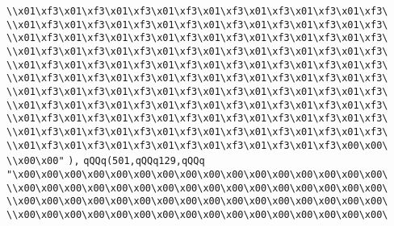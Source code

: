 \verb|\\x01\xf3\x01\xf3\x01\xf3\x01\xf3\x01\xf3\x01\xf3\x01\xf3\x01\xf3\|\newline
\verb|\\x01\xf3\x01\xf3\x01\xf3\x01\xf3\x01\xf3\x01\xf3\x01\xf3\x01\xf3\|\newline
\verb|\\x01\xf3\x01\xf3\x01\xf3\x01\xf3\x01\xf3\x01\xf3\x01\xf3\x01\xf3\|\newline
\verb|\\x01\xf3\x01\xf3\x01\xf3\x01\xf3\x01\xf3\x01\xf3\x01\xf3\x01\xf3\|\newline
\verb|\\x01\xf3\x01\xf3\x01\xf3\x01\xf3\x01\xf3\x01\xf3\x01\xf3\x01\xf3\|\newline
\verb|\\x01\xf3\x01\xf3\x01\xf3\x01\xf3\x01\xf3\x01\xf3\x01\xf3\x01\xf3\|\newline
\verb|\\x01\xf3\x01\xf3\x01\xf3\x01\xf3\x01\xf3\x01\xf3\x01\xf3\x01\xf3\|\newline
\verb|\\x01\xf3\x01\xf3\x01\xf3\x01\xf3\x01\xf3\x01\xf3\x01\xf3\x01\xf3\|\newline
\verb|\\x01\xf3\x01\xf3\x01\xf3\x01\xf3\x01\xf3\x01\xf3\x01\xf3\x01\xf3\|\newline
\verb|\\x01\xf3\x01\xf3\x01\xf3\x01\xf3\x01\xf3\x01\xf3\x01\xf3\x01\xf3\|\newline
\verb|\\x01\xf3\x01\xf3\x01\xf3\x01\xf3\x01\xf3\x01\xf3\x01\xf3\x00\x00\|\newline
\verb|\\x00\x00"|\newline
\verb|),|\newline
\verb|qQQq(501,qQQq129,qQQq|\newline
\verb|"\x00\x00\x00\x00\x00\x00\x00\x00\x00\x00\x00\x00\x00\x00\x00\x00\|\newline
\verb|\\x00\x00\x00\x00\x00\x00\x00\x00\x00\x00\x00\x00\x00\x00\x00\x00\|\newline
\verb|\\x00\x00\x00\x00\x00\x00\x00\x00\x00\x00\x00\x00\x00\x00\x00\x00\|\newline
\verb|\\x00\x00\x00\x00\x00\x00\x00\x00\x00\x00\x00\x00\x00\x00\x00\x00\|\newline
